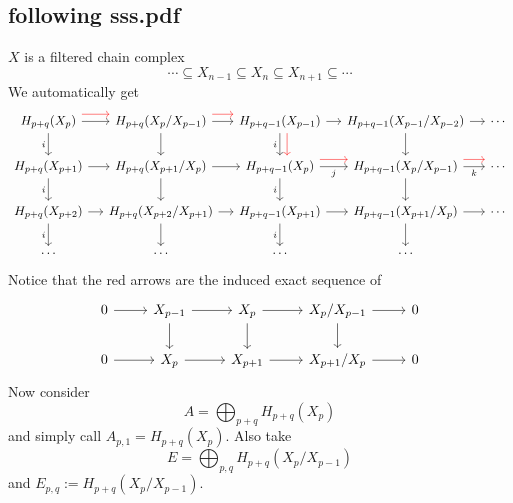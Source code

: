 \documentclass{article}
\begin{document}
\subsection{following sss.pdf}
$X$ is a filtered chain complex
\[\cdots\subseteq X_{n-1}\subseteq X_{n}\subseteq X_{n+1}\subseteq\cdots\]
We automatically get
\[\begin{tikzcd}[column sep=small]
	H_{p+q}(X_p)\arrow[r]\arrow[d,"i",swap]\arrow[r,red,shift={(0,0.2)}]&H_{p+q}(X_p/X_{p-1})\arrow[r]\arrow[r,red,shift={(0,0.2)}]\arrow[d]&H_{p+q-1}(X_{p-1})\arrow[r]\arrow[d,red,shift={(0.2,0)}]\arrow[d,"i",swap]&H_{p+q-1}(X_{p-1}/X_{p-2})\arrow[d]\arrow[r]&\cdots\\
	H_{p+q}(X_{p+1})\arrow[r]\arrow[d,"i",swap]&H_{p+q}(X_{p+1}/X_{p})\arrow[r]\arrow[d]&H_{p+q-1}(X_{p})\arrow[r,"j",swap]\arrow[r,red,shift={(0,0.2)}]\arrow[d,"i",swap]&H_{p+q-1}(X_{p}/X_{p-1})\arrow[r,red,shift={(0,0.2)}]\arrow[d]\arrow[r,"k",swap]&\cdots\\
	H_{p+q}(X_{p+2})\arrow[r]\arrow[d,"i",swap]&H_{p+q}(X_{p+2}/X_{p+1})\arrow[r]\arrow[d]&H_{p+q-1}(X_{p+1})\arrow[r]\arrow[d,"i",swap]&H_{p+q-1}(X_{p+1}/X_{p})\arrow[d]\arrow[r]&\cdots\\
	\cdots&\cdots&\cdots&\cdots
\end{tikzcd}\]
Notice that the red arrows are the induced exact sequence of
\[\begin{tikzcd}
	0\arrow[r]&X_{p-1}\arrow[r]\arrow[d]&X_{p}\arrow[r]\arrow[d]&X_{p}/X_{p-1}\arrow[r]\arrow[d]&0\\
	0\arrow[r]&X_p\arrow[r]&X_{p+1}\arrow[r]&X_{p+1}/X_p\arrow[r]&0
\end{tikzcd}\]
Now consider
\[A=\bigoplus_{p+q}H_{p+q}(X_p)\]
and simply call $A_{p,1}=H_{p+q}(X_p)$. Also take
\[E=\bigoplus_{p,q}H_{p+q}(X_p/X_{p-1})\]
and $E_{p,q}:=H_{p+q}(X_p/X_{p-1})$.
\end{document}
